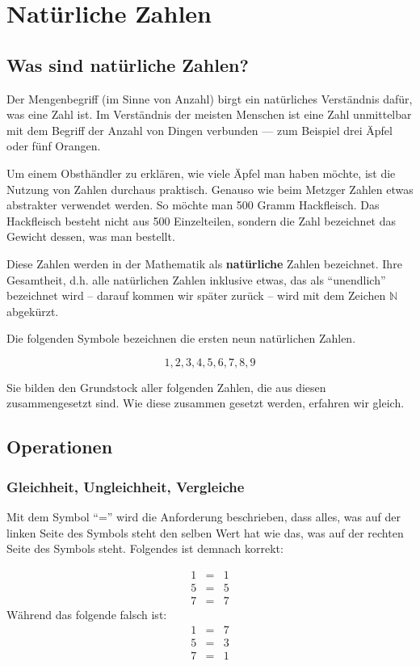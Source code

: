 
\chapter{Natürliche Zahlen}

\section{Was sind natürliche Zahlen?}

Der Mengenbegriff (im Sinne von Anzahl) birgt ein natürliches Verständnis dafür, was eine Zahl ist. Im Verständnis der meisten Menschen ist eine Zahl unmittelbar mit dem Begriff der Anzahl von Dingen verbunden --- zum Beispiel drei Äpfel oder fünf Orangen.

Um einem Obsthändler zu erklären, wie viele Äpfel man haben möchte, ist die Nutzung von Zahlen durchaus praktisch. Genauso wie beim Metzger Zahlen etwas abstrakter verwendet werden. So möchte man 500 Gramm Hackfleisch. Das Hackfleisch besteht nicht aus 500 Einzelteilen, sondern die Zahl bezeichnet das Gewicht dessen, was man bestellt.

Diese Zahlen werden in der Mathematik als \textbf{natürliche} Zahlen bezeichnet. Ihre Gesamtheit, d.h. alle natürlichen Zahlen inklusive etwas, das als "`unendlich"' bezeichnet wird -- darauf kommen wir später zurück -- wird mit dem Zeichen $\mathbb{N}$ abgekürzt.

Die folgenden Symbole bezeichnen die ersten neun natürlichen Zahlen. 

\[ 
1, 2, 3, 4, 5, 6, 7, 8, 9
\]

Sie bilden den Grundstock aller folgenden Zahlen, die aus diesen zusammengesetzt sind. Wie diese zusammen gesetzt werden, erfahren wir gleich.

\section{Operationen}

\subsection{Gleichheit, Ungleichheit, Vergleiche}

Mit dem Symbol "`="' wird die Anforderung beschrieben, dass alles, was auf der linken Seite des Symbols steht den selben Wert hat wie das, was auf der rechten Seite des Symbols steht. Folgendes ist demnach korrekt:

\begin{eqnarray*}
1 &=& 1 \\
5 &=& 5 \\
7 &=& 7
\end{eqnarray*}
Während das folgende falsch ist:
\begin{eqnarray*}
1 &=& 7 \\
5 &=& 3 \\
7 &=& 1
\end{eqnarray*}

